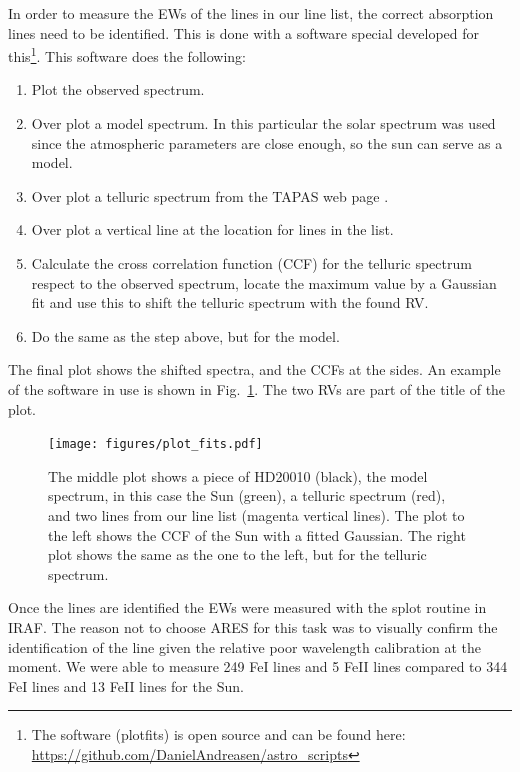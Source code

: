 \documentclass{aa}
\begin{document}
In order to measure the EWs of the lines in our line list, the
correct absorption lines need to be identified. This is done
with a software special developed for this\footnote{The software
(plot\textunderscore{}fits) is open source and can be found here:
\url{https://github.com/DanielAndreasen/astro_scripts}}. This software
does the following:
\begin{enumerate}
    \item Plot the observed spectrum.
    \item Over plot a model spectrum. In this particular the solar spectrum was
        used since the atmospheric parameters are close enough, so the sun can
        serve as a model.
    \item Over plot a telluric spectrum from the TAPAS web page \citep{Bertaux2014}.
    \item Over plot a vertical line at the location for lines in the list.
    \item Calculate the cross correlation function (CCF) for the telluric spectrum
        respect to the observed spectrum, locate the maximum value by a Gaussian fit
        and use this to shift the telluric spectrum with the found RV.
    \item Do the same as the step above, but for the model.
\end{enumerate}
The final plot shows the shifted spectra, and the CCFs at the sides. An example
of the software in use is shown in Fig.~\ref{fig:plot_fits}. The two RVs are
part of the title of the plot.



\begin{figure}[tbp!]
    \centering
    \texttt{[image: figures/plot\_fits.pdf]}
    \caption{The middle plot shows a piece of HD20010 (black), the model
    spectrum, in this case the Sun (green), a telluric spectrum (red), and two
    lines from our line list (magenta vertical lines). The plot to the left
    shows the CCF of the Sun with a fitted Gaussian. The right plot shows the
    same as the one to the left, but for the telluric spectrum.}
    \label{fig:plot_fits}
\end{figure}

Once the lines are identified the EWs were measured with the splot
routine in IRAF. The reason not to choose ARES for this task was to
visually confirm the identification of the line given the relative poor
wavelength calibration at the moment. We were able to measure 249 FeI
lines and 5 FeII lines compared to 344 FeI lines and 13 FeII lines for
the Sun.
\end{document}
